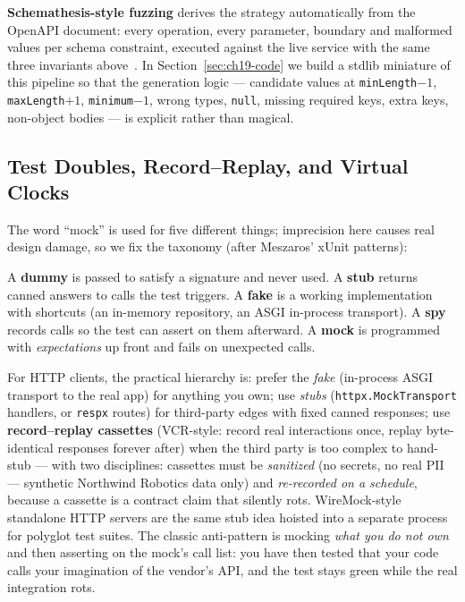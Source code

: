 \textbf{Schemathesis-style fuzzing} derives the strategy automatically
from the OpenAPI document: every operation, every parameter, boundary and
malformed values per schema constraint, executed against the live service
with the same three invariants above~\cite{openapi31}. In
Section~\ref{sec:ch19-code} we build a stdlib miniature of this pipeline so
that the generation logic --- candidate values at \texttt{minLength}$-1$,
\texttt{maxLength}$+1$, \texttt{minimum}$-1$, wrong types, \texttt{null},
missing required keys, extra keys, non-object bodies --- is explicit rather
than magical.

\subsection{Test Doubles, Record--Replay, and Virtual Clocks}
\label{sec:ch19-doubles}

The word ``mock'' is used for five different things; imprecision here
causes real design damage, so we fix the taxonomy (after Meszaros'
xUnit patterns):

\begin{definition}
\label{def:doubles}
A \textbf{dummy} is passed to satisfy a signature and never used. A
\textbf{stub} returns canned answers to calls the test triggers. A
\textbf{fake} is a working implementation with shortcuts (an in-memory
repository, an ASGI in-process transport). A \textbf{spy} records calls so
the test can assert on them afterward. A \textbf{mock} is programmed with
\emph{expectations} up front and fails on unexpected calls.
\end{definition}

For HTTP clients, the practical hierarchy is: prefer the \emph{fake}
(in-process ASGI transport to the real app) for anything you own; use
\emph{stubs} (\texttt{httpx.MockTransport} handlers, or \texttt{respx}
routes) for third-party edges with fixed canned responses; use
\textbf{record--replay cassettes} (VCR-style: record real interactions
once, replay byte-identical responses forever after) when the third party
is too complex to hand-stub --- with two disciplines: cassettes must be
\emph{sanitized} (no secrets, no real PII --- synthetic Northwind Robotics
data only) and \emph{re-recorded on a schedule}, because a cassette is a
contract claim that silently rots. WireMock-style standalone HTTP servers
are the same stub idea hoisted into a separate process for polyglot test
suites. The classic anti-pattern is mocking \emph{what you do not own} and
then asserting on the mock's call list: you have then tested that your code
calls your imagination of the vendor's API, and the test stays green while
the real integration rots.

